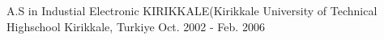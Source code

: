 

\begin{cventries}

  \cventry
    {A.S in Industial Electronic} %
    {KIRIKKALE(Kirikkale University of Technical Highschool} %
    {Kirikkale, Turkiye} %
    {Oct. 2002 - Feb. 2006} %
\end{cventries}
